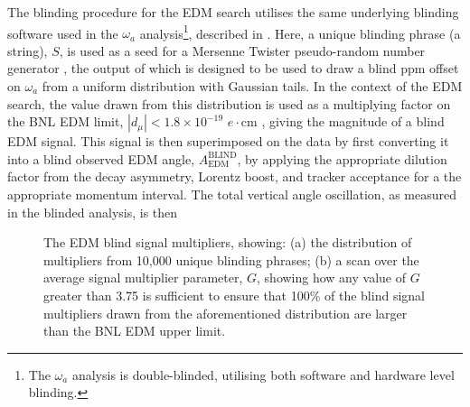 The blinding procedure for the EDM search utilises the same underlying blinding software used in the $\omega_{a}$ analysis\footnote{The $\omega_{a}$ analysis is double-blinded, utilising both software and hardware level blinding.}, described in \cite{OmegaARun1}. Here, a unique blinding phrase (a string), $S$, is used as a seed for a Mersenne Twister pseudo-random number generator \cite{MersenneTwister}, the output of which is designed to be used to draw a blind ppm offset on $\omega_{a}$ from a uniform distribution with Gaussian tails. In the context of the EDM search, the value drawn from this distribution is used as a multiplying factor on the BNL EDM limit, $|d_{\mu}|<1.8\times10^{-19}$ $e\cdot$cm \cite{BNLEDM}, giving the magnitude of a blind EDM signal. This signal is then superimposed on the data by first converting it into a blind observed EDM angle, $A_{\text{EDM}}^{\text{BLIND}}$, by applying the appropriate dilution factor from the decay asymmetry, Lorentz boost, and tracker acceptance for a the appropriate momentum interval. The total vertical angle oscillation, as measured in the blinded analysis, is then
%
\begin{figure}[t!]
\centering{}
\caption{The EDM blind signal multipliers, showing: (a) the distribution of multipliers from 10,000 unique blinding phrases; (b) a scan over the average signal multiplier parameter, $G$, showing how any value of $G$ greater than 3.75 is sufficient to ensure that 100\% of the blind signal multipliers drawn from the aforementioned distribution are larger than the BNL EDM upper limit.}
\label{fig:Blinding}
\end{figure} 
